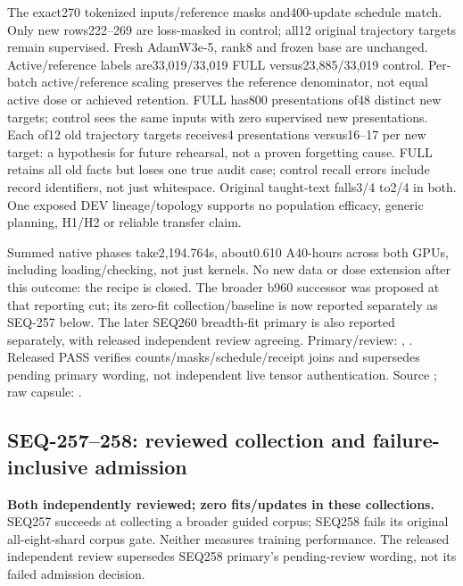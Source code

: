 \documentclass{article}
\begin{document}
The exact270 tokenized inputs/reference masks and400-update schedule match.
Only new rows222--269 are loss-masked in control; all12 original trajectory
targets remain supervised. Fresh AdamW3e-5, rank8 and frozen base are unchanged.
Active/reference labels are33,019/33,019 FULL versus23,885/33,019 control.
Per-batch active/reference scaling preserves the reference denominator, not
equal active dose or achieved retention. FULL has800 presentations of48 distinct new targets;
control sees the same inputs with zero supervised new presentations. Each of12
old trajectory targets receives4 presentations versus16--17 per new target:
a hypothesis for future rehearsal, not a proven forgetting cause. FULL retains
all old facts but loses one true audit case; control recall errors include record
identifiers, not just whitespace. Original taught-text falls3/4 to2/4 in both.
One exposed DEV lineage/topology supports no population efficacy, generic
planning, H1/H2 or reliable transfer claim.

Summed native phases take2,194.764s, about0.610 A40-hours across both GPUs,
including loading/checking, not just kernels. No new data or dose extension
after this outcome: the recipe is closed. The broader b960 successor was
proposed at that reporting cut; its zero-fit collection/baseline is now reported
separately as SEQ-257 below. The later SEQ260 breadth-fit primary is also
reported separately, with released independent review agreeing. Primary/review:
,
.
Released PASS verifies counts/masks/schedule/receipt joins and supersedes pending
primary wording, not independent live tensor authentication. Source
; raw capsule:
.

\subsection{SEQ-257--258: reviewed collection and failure-inclusive admission}
\label{sec:breadth-scale-collection}

\textbf{Both independently reviewed; zero fits/updates in these collections.}
SEQ257 succeeds at collecting a broader guided corpus; SEQ258 fails its original
all-eight-shard corpus gate. Neither measures training performance. The released
independent review supersedes SEQ258 primary's pending-review wording, not its
failed admission decision.
\end{document}

